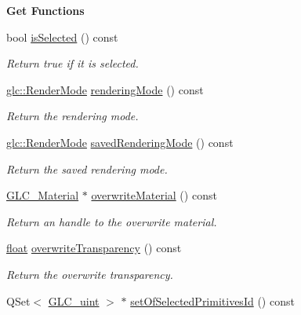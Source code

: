\begin{Indent}{\bf Get Functions}\par
\begin{DoxyCompactItemize}
\item 
bool \hyperlink{class_g_l_c___render_properties_a21a0c976e61581e9c660ae62562757cc}{is\-Selected} () const 
\begin{DoxyCompactList}\small\item\em Return true if it is selected. \end{DoxyCompactList}\item 
\hyperlink{namespaceglc_a07d65b257fe4f2b50ce733149d41c87c}{glc\-::\-Render\-Mode} \hyperlink{class_g_l_c___render_properties_ac8e0d86c88d9518a5326c5bc0dbcf02a}{rendering\-Mode} () const 
\begin{DoxyCompactList}\small\item\em Return the rendering mode. \end{DoxyCompactList}\item 
\hyperlink{namespaceglc_a07d65b257fe4f2b50ce733149d41c87c}{glc\-::\-Render\-Mode} \hyperlink{class_g_l_c___render_properties_add247fd4234a3df252a9159abe1b77e4}{saved\-Rendering\-Mode} () const 
\begin{DoxyCompactList}\small\item\em Return the saved rendering mode. \end{DoxyCompactList}\item 
\hyperlink{class_g_l_c___material}{G\-L\-C\-\_\-\-Material} $\ast$ \hyperlink{class_g_l_c___render_properties_a5d27342cd90cb3f1299e6eb68cb6ae0c}{overwrite\-Material} () const 
\begin{DoxyCompactList}\small\item\em Return an handle to the overwrite material. \end{DoxyCompactList}\item 
\hyperlink{_super_l_u_support_8h_a6a1bb6ed41f44b60e7bd83b0e9945aa7}{float} \hyperlink{class_g_l_c___render_properties_ae5d567fb3315425bd9ab60cf57694f81}{overwrite\-Transparency} () const 
\begin{DoxyCompactList}\small\item\em Return the overwrite transparency. \end{DoxyCompactList}\item 
Q\-Set$<$ \hyperlink{glc__global_8h_abf950976fabed69026558df8e2da6c6b}{G\-L\-C\-\_\-uint} $>$ $\ast$ \hyperlink{class_g_l_c___render_properties_a32ec254569f889def633d3d58612a413}{set\-Of\-Selected\-Primitives\-Id} () const 

\end{DoxyCompactItemize}
\end{Indent}
